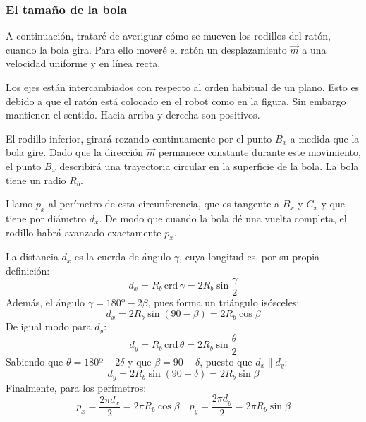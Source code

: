 \documentclass[10pt,a4paper,hidelinks]{article}
\begin{document}
\begin{multicols}{2}
\begin{center}
\end{center}

\subsubsection{El tamaño de la bola}

A continuación, trataré de averiguar cómo se mueven los rodillos del ratón, 
cuando la bola gira. Para ello moveré el ratón un desplazamiento $\vec{m}$ a una 
velocidad uniforme y en línea recta.

Los ejes están intercambiados con respecto al orden habitual de un plano. Esto 
es debido a que el ratón está colocado en el robot como en la figura. Sin 
embargo mantienen el sentido. Hacia arriba y derecha son positivos.

El rodillo inferior, girará rozando continuamente por el punto $B_x$ a medida 
que la bola gire. Dado que la dirección $\vec{m}$ permanece constante durante 
este movimiento, el punto $B_x$ describirá una trayectoria circular en la 
superficie de la bola. La bola tiene un radio $R_b$.

Llamo $p_x$ al perímetro de esta circunferencia, que es tangente a $B_x$ y $C_x$ 
y que tiene por diámetro $d_x$. De modo que cuando la bola dé una vuelta 
completa, el rodillo habrá avanzado exactamente $p_x$.

La distancia $d_x$ es la cuerda de ángulo $\gamma$, cuya longitud es, por su 
propia definición:
$$ d_x = R_b \, \text{crd} \, \gamma = 2R_b \sin \frac{\gamma}{2}$$
Además, el ángulo $\gamma = 180º - 2\beta$, pues forma un triángulo isósceles:
$$ d_x = 2R_b \sin(90-\beta) = 2R_b\cos \beta$$
De igual modo para $d_y$:
$$ d_y = R_b \, \text{crd} \, \theta = 2R_b \sin \frac{\theta}{2} $$
Sabiendo que $\theta = 180º - 2\delta$ y que $\beta = 90 - \delta$, puesto que 
$d_x \parallel d_y$:
$$ d_y = 2R_b \sin (90 - \delta) = 2R_b \sin \beta $$
Finalmente, para los perímetros:
$$ p_x = \frac{2\pi d_x}{2} = 2 \pi R_b\cos \beta \quad  p_y = \frac{2\pi 
d_y}{2} = 2 \pi R_b\sin \beta $$


\end{multicols}
\end{document}
